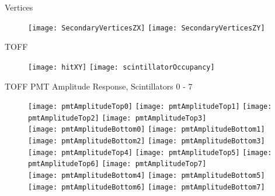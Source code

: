 \documentclass[11pt]{beamer}
\begin{document}
\begin{frame}{Vertices}
\begin{figure}
\centering
\texttt{[image: SecondaryVerticesZX]}
\texttt{[image: SecondaryVerticesZY]}
\end{figure}
\end{frame}

\begin{frame}{TOFF}
\begin{figure}
\centering
\texttt{[image: hitXY]}
\texttt{[image: scintillatorOccupancy]}
\end{figure}
\end{frame}

\begin{frame}{TOFF PMT Amplitude Response, Scintillators 0 - 7}
\begin{figure}
\centering
\texttt{[image: pmtAmplitudeTop0]}
\texttt{[image: pmtAmplitudeTop1]}
\texttt{[image: pmtAmplitudeTop2]}
\texttt{[image: pmtAmplitudeTop3]} \\ 
\texttt{[image: pmtAmplitudeBottom0]}
\texttt{[image: pmtAmplitudeBottom1]}
\texttt{[image: pmtAmplitudeBottom2]}
\texttt{[image: pmtAmplitudeBottom3]} \\
\texttt{[image: pmtAmplitudeTop4]}
\texttt{[image: pmtAmplitudeTop5]}
\texttt{[image: pmtAmplitudeTop6]}
\texttt{[image: pmtAmplitudeTop7]} \\
\texttt{[image: pmtAmplitudeBottom4]}
\texttt{[image: pmtAmplitudeBottom5]}
\texttt{[image: pmtAmplitudeBottom6]}
\texttt{[image: pmtAmplitudeBottom7]} \\
\end{figure}
\end{frame}
\end{document}
